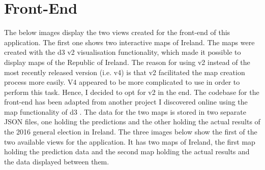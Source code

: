 \section{Front-End}
The below images display the two views created for the front-end of this application. The first one shows two interactive maps of Ireland. The maps were created with the d3 v2 visualisation functionality, which made it possible to display maps of the Republic of Ireland. The reason for using v2 instead of the most recently released version (i.e. v4) is that v2 facilitated the map creation process more easily. V4 appeared to be more complicated to use in order to perform this task. Hence, I decided to opt for v2 in the end. 
The codebase for the front-end has been adapted from another project I discovered online using the map functionality of d3 \cite{tax}. The data for the two maps is stored in two separate JSON files, one holding the predictions and the other holding the actual results of the 2016 general election in Ireland. The three images below show the first of the two available views for the application. It has two maps of Ireland, the first map holding the prediction data and the second map holding the actual results and the data displayed between them. 

